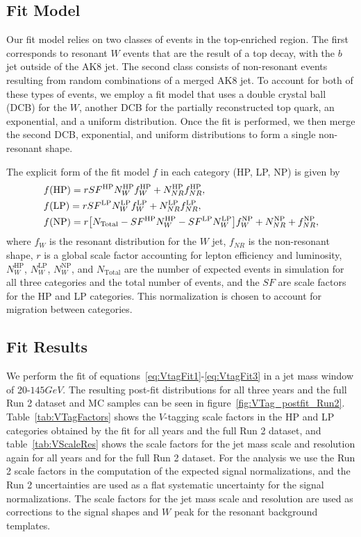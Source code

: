\subsection{Fit Model}

Our fit model relies on two classes of events in the top-enriched region.
The first corresponds to resonant $W$ events that are the result of a top decay, with the $b$ jet outside of the AK8 jet.
The second class consists of non-resonant events resulting from random combinations of a merged AK8 jet.
To account for both of these types of events, we employ a fit model that uses a double crystal ball (DCB) for the $W$, another DCB for the partially reconstructed top quark, an exponential, and a uniform distribution.
Once the fit is performed, we then merge the second DCB, exponential, and uniform distributions to form a single non-resonant shape.

The explicit form of the fit model $f$ in each category (HP, LP, NP) is given by
\begin{align}
  & f(\mathrm{HP})=rSF^\mathrm{HP}N_W^\mathrm{HP}f_W^\mathrm{HP}+N_{NR}^\mathrm{HP}f_{NR}^\mathrm{HP},\label{eq:VtagFit1}\\
  & f(\mathrm{LP})=rSF^\mathrm{LP}N_W^\mathrm{LP}f_W^\mathrm{LP}+N_{NR}^\mathrm{LP}f_{NR}^\mathrm{LP},\label{eq:VtagFit2}\\
  & f(\mathrm{NP})=r\bqty{N_\mathrm{Total}-SF^\mathrm{HP}N_W^\mathrm{HP}-SF^\mathrm{LP}N_W^\mathrm{LP}}f_W^\mathrm{NP}+N_{NR}^\mathrm{NP}+f_{NR}^\mathrm{NP},\label{eq:VtagFit3}
\end{align}
where $f_W$ is the resonant distribution for the $W$ jet, $f_{NR}$ is the non-resonant shape, $r$ is a global scale factor accounting for lepton efficiency and luminosity, $N_{W}^\mathrm{HP}$, $N_{W}^\mathrm{LP}$, $N_{W}^\mathrm{NP}$, and $N_\mathrm{Total}$ are the number of expected events in simulation for all three categories and the total number of events, and the $SF$ are scale factors for the HP and LP categories.
This normalization is chosen to account for migration between categories.

\subsection{Fit Results}

We perform the fit of equations~\ref{eq:VtagFit1}-\ref{eq:VtagFit3} in a jet mass window of 20-$145\unit{GeV}$.
The resulting post-fit distributions for all three years and the full Run 2 dataset and MC samples can be seen in figure~\ref{fig:VTag_postfit_Run2}.
Table~\ref{tab:VTagFactors} shows the $V$-tagging scale factors in the HP and LP categories obtained by the fit for all years and the full Run 2 dataset, and table~\ref{tab:VScaleRes} shows the scale factors for the jet mass scale and resolution again for all years and for the full Run 2 dataset.
For the analysis we use the Run 2 scale factors in the computation of the expected signal normalizations, and the Run 2 uncertainties are used as a flat systematic uncertainty for the signal normalizations.
The scale factors for the jet mass scale and resolution are used as corrections to the signal shapes and $W$ peak for the resonant background templates.

